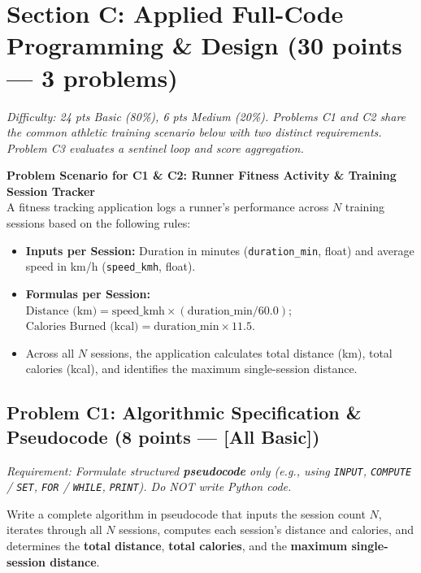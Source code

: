 \documentclass[11pt,a4paper]{article}
\begin{document}
\section*{Section C: Applied Full-Code Programming \& Design \hfill \normalsize\normalfont(30 points --- 3 problems)}
\textit{Difficulty: 24 pts Basic (80\%), 6 pts Medium (20\%). Problems C1 and C2 share the common athletic training scenario below with two distinct requirements. Problem C3 evaluates a sentinel loop and score aggregation.}

\begin{tcolorbox}[colback=boxbg, colframe=secondaryteal, arc=1.2mm, boxrule=0.6pt, left=2.0mm, right=2.0mm, top=0.6mm, bottom=0.6mm]
\textbf{\small Problem Scenario for C1 \& C2: Runner Fitness Activity \& Training Session Tracker}\\[0.2mm]
\footnotesize
A fitness tracking application logs a runner's performance across $N$ training sessions based on the following rules:
\begin{itemize}[itemsep=0.1pt,topsep=0.1pt]
  \item \textbf{Inputs per Session:} Duration in minutes (\texttt{duration\_min}, float) and average speed in km/h (\texttt{speed\_kmh}, float).
  \item \textbf{Formulas per Session:}
    $\text{Distance (km)} = \text{speed\_kmh} \times (\text{duration\_min} / 60.0)$; \quad
    $\text{Calories Burned (kcal)} = \text{duration\_min} \times 11.5$.
  \item Across all $N$ sessions, the application calculates total distance (km), total calories (kcal), and identifies the maximum single-session distance.
\end{itemize}
\end{tcolorbox}

\vspace{0.3mm}
\subsection*{Problem C1: Algorithmic Specification \& Pseudocode (8 points --- [All Basic])}
\textit{Requirement: Formulate structured \textbf{pseudocode} only (e.g., using \texttt{INPUT}, \texttt{COMPUTE} / \texttt{SET}, \texttt{FOR} / \texttt{WHILE}, \texttt{PRINT}). Do NOT write Python code.}

Write a complete algorithm in pseudocode that inputs the session count $N$, iterates through all $N$ sessions, computes each session's distance and calories, and determines the \textbf{total distance}, \textbf{total calories}, and the \textbf{maximum single-session distance}.
\end{document}
